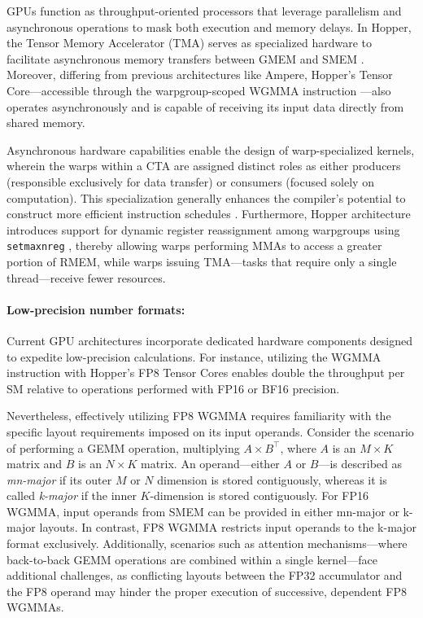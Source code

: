 GPUs function as throughput-oriented processors that leverage parallelism and asynchronous operations to mask both execution and memory delays. In Hopper, the Tensor Memory Accelerator (TMA) serves as specialized hardware to facilitate asynchronous memory transfers between GMEM and SMEM \cite[\S7.29]{cuda}. Moreover, differing from previous architectures like Ampere, Hopper’s Tensor Core—accessible through the warpgroup-scoped WGMMA instruction \cite[\S9.7.14]{ptx}—also operates asynchronously and is capable of receiving its input data directly from shared memory.

Asynchronous hardware capabilities enable the design of warp-specialized kernels, wherein the warps within a CTA are assigned distinct roles as either producers (responsible exclusively for data transfer) or consumers (focused solely on computation). This specialization generally enhances the compiler’s potential to construct more efficient instruction schedules \citep{warp-specialization-2011}. Furthermore, Hopper architecture introduces support for dynamic register reassignment among warpgroups using \verb|setmaxnreg| \cite[\S9.7.17.1]{ptx}, thereby allowing warps performing MMAs to access a greater portion of RMEM, while warps issuing TMA—tasks that require only a single thread—receive fewer resources.

\paragraph{Low-precision number formats:}
\label{sec:low-precision-gpu}
Current GPU architectures incorporate dedicated hardware components designed to expedite low-precision calculations. For instance, utilizing the WGMMA instruction with Hopper's FP8 Tensor Cores enables double the throughput per SM relative to operations performed with FP16 or BF16 precision.

Nevertheless, effectively utilizing FP8 WGMMA requires familiarity with the specific layout requirements imposed on its input operands. Consider the scenario of performing a GEMM operation, multiplying $A \times B^{\top}$, where $A$ is an $M \times K$ matrix and $B$ is an $N \times K$ matrix. An operand—either $A$ or $B$—is described as \emph{mn-major} if its outer $M$ or $N$ dimension is stored contiguously, whereas it is called \emph{k-major} if the inner $K$-dimension is stored contiguously. For FP16 WGMMA, input operands from SMEM can be provided in either mn-major or k-major layouts. In contrast, FP8 WGMMA restricts input operands to the k-major format exclusively. Additionally, scenarios such as attention mechanisms—where back-to-back GEMM operations are combined within a single kernel—face additional challenges, as conflicting layouts between the FP32 accumulator and the FP8 operand may hinder the proper execution of successive, dependent FP8 WGMMAs.

